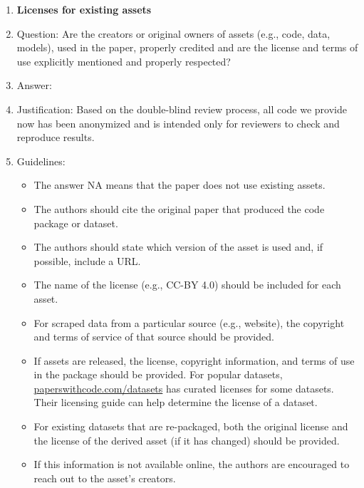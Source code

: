 \documentclass{article}
\begin{document}
\begin{enumerate}
\item {\bf Licenses for existing assets}
    \item[] Question: Are the creators or original owners of assets (e.g., code, data, models), used in the paper, properly credited and are the license and terms of use explicitly mentioned and properly respected?
    \item[] Answer: \answerNo{} %
    \item[] Justification: Based on the double-blind review process, all code we provide now has been anonymized and is intended only for reviewers to check and reproduce results.
    \item[] Guidelines:
    \begin{itemize}
        \item The answer NA means that the paper does not use existing assets.
        \item The authors should cite the original paper that produced the code package or dataset.
        \item The authors should state which version of the asset is used and, if possible, include a URL.
        \item The name of the license (e.g., CC-BY 4.0) should be included for each asset.
        \item For scraped data from a particular source (e.g., website), the copyright and terms of service of that source should be provided.
        \item If assets are released, the license, copyright information, and terms of use in the package should be provided. For popular datasets, \url{paperswithcode.com/datasets} has curated licenses for some datasets. Their licensing guide can help determine the license of a dataset.
        \item For existing datasets that are re-packaged, both the original license and the license of the derived asset (if it has changed) should be provided.
        \item If this information is not available online, the authors are encouraged to reach out to the asset's creators.
    \end{itemize}


\end{enumerate}
\end{document}
